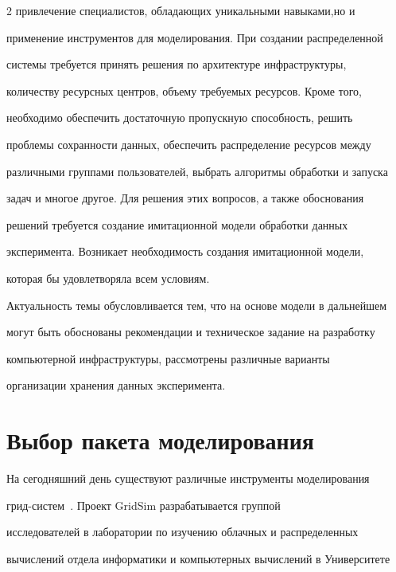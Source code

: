 \begin{multicols}{2}
привлечение специалистов, обладающих уникальными навыками,\linebreak но и 


применение инструментов для {моделирования}. При создании распределенной 


системы требуется принять решения по архитектуре инфраструктуры, 


количеству ресурсных центров, объему \mbox{требуемых} ресурсов. Кроме того, 


необходимо обеспечить достаточную пропускную способность, решить 


проблемы сохранности данных, обеспечить распределение ресурсов между 


различными группами пользователей, выбрать алгоритмы обработки и запуска 


задач и многое другое. Для решения этих вопросов, а также обоснования 


решений требуется создание имитационной модели обработки данных 


эксперимента. Возникает необходимость создания имитационной модели, 


которая бы удовлетворяла всем условиям. 


   


   Актуальность темы обусловливается тем, что на основе модели в дальнейшем 


могут быть обоснованы рекомендации и техническое задание на разработку 


компьютерной инфраструктуры, рас\-смот\-ре\-ны различные варианты 


организации хранения данных эксперимента. 





\section{Выбор пакета моделирования}





   На сегодняшний день существуют различные инструменты моделирования 


грид-сис\-тем~\cite{5-kor}. Проект GridSim разрабатывается группой 


исследователей в лаборатории по изучению облачных и распределенных 


вычислений отдела информатики и компьютерных вычислений в Университете 



\end{multicols}
